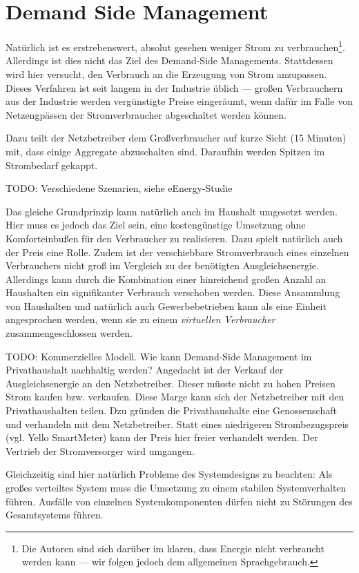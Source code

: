 
\section{Demand Side Management}\label{sec:demandside}
Natürlich ist es erstrebenswert, absolut gesehen weniger Strom zu
verbrauchen\footnote{Die Autoren sind sich darüber im klaren, dass Energie
nicht verbraucht werden kann --- wir folgen jedoch dem allgemeinen
Sprachgebrauch.}. Allerdings ist dies nicht das Ziel des Demand-Side
Managements. Stattdessen wird hier versucht, den Verbrauch an die
Erzeugung von Strom anzupassen. Dieses Verfahren ist seit langem in der
Industrie üblich --- großen Verbrauchern aus der Industrie werden
vergünstigte Preise eingeräumt, wenn dafür im Falle von Netzengpässen
der Stromverbraucher abgeschaltet werden können. 

Dazu teilt der Netzbetreiber dem Großverbraucher auf kurze Sicht (15
Minuten) mit, dass einige Aggregate abzuschalten sind. Daraufhin werden
Spitzen im Strombedarf gekappt.

TODO: Verschiedene Szenarien, siehe eEnergy-Studie

Das gleiche Grundprinzip kann natürlich auch im Haushalt umgesetzt
werden. Hier muss es jedoch das Ziel sein, eine kostengünstige Umsetzung
ohne Komforteinbußen für den Verbraucher zu realisieren. Dazu spielt
natürlich auch der Preis eine Rolle. Zudem ist der verschiebbare
Stromverbrauch eines einzelnen Verbrauchers nicht groß im Vergleich zu
der benötigten Ausgleichsenergie. Allerdings kann durch die Kombination
einer hinreichend großen Anzahl an Haushalten ein signifikanter
Verbrauch verschoben werden. Diese Ansammlung von Haushalten und
natürlich auch Gewerbebetrieben kann als eine Einheit angesprochen
werden, wenn sie zu einem \emph{virtuellen Verbraucher}
zusammengeschlossen werden.

TODO: Kommerzielles Modell. Wie kann Demand-Side Management im
Privathaushalt nachhaltig werden? Angedacht ist der Verkauf der
Ausgleichsenergie an den Netzbetreiber. Dieser müsste nicht zu hohen
Preisen Strom kaufen bzw. verkaufen. Diese Marge kann sich der
Netzbetreiber mit den Privathaushalten teilen. Dzu gründen die
Privathaushalte eine Genossenschaft und verhandeln mit dem
Netzbetreiber. Statt eines niedrigeren Strombezugspreis (vgl. Yello
SmartMeter) kann der Preis hier freier verhandelt werden. Der Vertrieb
der Stromversorger wird umgangen.

Gleichzeitig sind hier natürlich Probleme des Systemdesigns zu beachten:
Als großes verteiltes System muss die Umsetzung zu einem stabilen
Systemverhalten führen. Ausfälle von einzelnen Systemkomponenten dürfen
nicht zu Störungen des Gesamtsystems führen.

